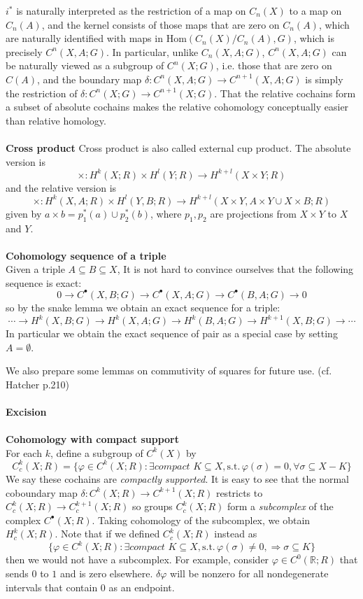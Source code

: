 \documentclass[12pt]{article}
\theoremstyle{plain}
\theoremstyle{definition}
\newcommand{\IR}{\mathbb{R}}
\newcommand{\Hom}{\mathrm{Hom}}
\newcommand{\<}{\langle}
\renewcommand{\>}{\rangle}
\newcommand{\st}{\mathrm{s.t.}\,}
\begin{document}
$i^*$ is naturally interpreted as the restriction of a map on $C_n(X)$ to a map on $C_n(A)$, and the kernel consists of those maps that are zero on $C_n(A)$, which are naturally identified with maps in $\Hom(C_n(X)/C_n(A), G)$, which is precisely $C^n(X, A; G)$. In particular, unlike $C_n(X, A; G)$, $C^n(X, A; G)$ can be naturally viewed as a subgroup of $C^n(X; G)$, i.e. those that are zero on $C(A)$, and the boundary map $\delta : C^n(X, A; G) \to C^{n+1}(X, A; G)$ is simply the restriction of $\delta : C^n(X; G) \to C^{n+1}(X; G)$. That the relative cochains form a subset of absolute cochains makes the relative cohomology conceptually easier than relative homology. \\\\
\textbf{Cross product}
Cross product is also called external cup product. The absolute version is 
$$ \times : H^k(X; R) \times H^l(Y; R) \to H^{k + l}(X \times Y; R) $$
and the relative version is 
$$ \times : H^k(X, A; R) \times H^l(Y, B; R) \to H^{k + l}(X \times Y, A \times Y \cup X \times B; R)$$
given by $a \times b = p_1^*(a) \cup p_2^*(b)$, where $p_1, p_2$ are projections from $X \times Y$ to $X$ and $Y$. \\\\
\textbf{Cohomology sequence of a triple}\\
Given a triple $A \subseteq B \subseteq X$, It is not hard to convince ourselves that the following sequence is exact:
$$ 0 \to C^\bullet (X, B; G) \to C^\bullet (X, A; G) \to C^\bullet(B, A; G) \to 0 $$
so by the snake lemma we obtain an exact sequence for a triple:
$$ \cdots \to H^k(X, B; G) \to H^k(X, A; G) \to H^k(B, A; G) \to H^{k + 1}(X, B; G) \to \cdots $$
In particular we obtain the exact sequence of pair as a special case by setting $A = \emptyset$. 

We also prepare some lemmas on commutivity of squares for future use. (cf. Hatcher p.210)\\\\
\textbf{Excision}\\\\
\textbf{Cohomology with compact support}\\
For each $k$, define a subgroup of $C^k(X)$ by 
$$ C_c^k(X; R) = \{ \varphi \in C^k(X; R) : \exists \textit{compact } K \subseteq X, \st \varphi(\sigma) = 0, \forall \sigma \subseteq X - K \} $$ 
We say these cochains are \textit{compactly supported}. It is easy to see that the normal coboundary map $\delta : C^k(X; R) \to C^{k + 1}(X; R)$ restricts to $C^k_c(X; R) \to C^{k + 1}_c(X; R)$ so groups $C^k_c(X; R)$ form a \textit{subcomplex} of the complex $C^\bullet(X; R)$. Taking cohomology of the subcomplex, we obtain $H^k_c(X; R)$. Note that if we defined $C_c^k(X; R)$ instead as 
$$ \{ \varphi \in C^k(X; R) : \exists \textit{compact } K \subseteq X, \st \varphi(\sigma) \neq 0, \Rightarrow \sigma \subseteq K \}$$
then we would not have a subcomplex. For example, consider $\varphi \in C^0(\IR; R)$ that sends $0$ to $1$ and is zero elsewhere. $\delta \varphi$ will be nonzero for all nondegenerate intervals that contain $0$ as an endpoint. 
\end{document}

